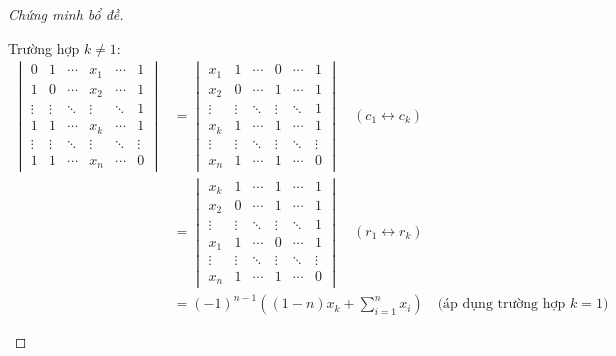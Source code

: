 \begin{proof}[Chứng minh bổ đề]
\begin{enumerate}[label = (\roman*)]
              Trường hợp $k\ne 1$:
              \begingroup{}
              \allowdisplaybreaks{}
              \begin{align*}
                  \begin{vmatrix}
                      0      & 1      & \cdots & x_{1}  & \cdots & 1      \\
                      1      & 0      & \cdots & x_{2}  & \cdots & 1      \\
                      \vdots & \vdots & \ddots & \vdots & \ddots & 1      \\
                      1      & 1      & \cdots & x_{k}  & \cdots & 1      \\
                      \vdots & \vdots & \ddots & \vdots & \ddots & \vdots \\
                      1      & 1      & \cdots & x_{n}  & \cdots & 0
                  \end{vmatrix}
                   & =
                  \begin{vmatrix}
                      x_{1}  & 1      & \cdots & 0      & \cdots & 1      \\
                      x_{2}  & 0      & \cdots & 1      & \cdots & 1      \\
                      \vdots & \vdots & \ddots & \vdots & \ddots & 1      \\
                      x_{k}  & 1      & \cdots & 1      & \cdots & 1      \\
                      \vdots & \vdots & \ddots & \vdots & \ddots & \vdots \\
                      x_{n}  & 1      & \cdots & 1      & \cdots & 0
                  \end{vmatrix}\quad(c_{1} \leftrightarrow c_{k}) \\
                   & =
                  \begin{vmatrix}
                      x_{k}  & 1      & \cdots & 1      & \cdots & 1      \\
                      x_{2}  & 0      & \cdots & 1      & \cdots & 1      \\
                      \vdots & \vdots & \ddots & \vdots & \ddots & 1      \\
                      x_{1}  & 1      & \cdots & 0      & \cdots & 1      \\
                      \vdots & \vdots & \ddots & \vdots & \ddots & \vdots \\
                      x_{n}  & 1      & \cdots & 1      & \cdots & 0
                  \end{vmatrix}\quad(r_{1} \leftrightarrow r_{k}) \\
                   & =
                  {(-1)}^{n-1}\left((1-n)x_{k} + \sum^{n}_{i=1}x_{i}\right) \quad\text{(áp dụng trường hợp $k=1$)}
              \end{align*}
              \endgroup{}
    \end{enumerate}
\end{proof}

